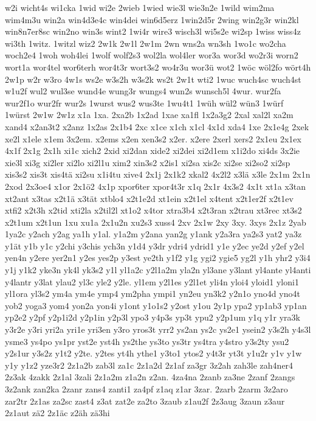 {w2i
wicht4s
wi1cka
1wid
wi2e
2wieb
1wied
wie3l
wie3n2e
1wild
wim2ma
wim4m3u
win2a
win4d3e4c
win4dei
win6d5erz
1win2d5r
2wing
win2g3r
win2kl
win8n7er8sc
win2no
win3s
wint2
1wi4r
wire3
wisch3l
wi5s2e
wi2sp
1wiss
wiss4z
wi3th
1witz.
1witzl
wiz2
2w1k
2w1l
2w1m
2wn
wns2a
wn3sh
1wo1c
wo2cha
woch2e4
1woh
woh4lei
1wolf
wolf2s3
wol2la
wol4ler
wor3a
wor3d
wo2r3i
worn2
wort1a
wor4tel
wor6terh
wor4t3r
wort3s2
wo4r3u
wor3ü
wot2
1wöc
wöl2fo
wört4h
2w1p
w2r
w3ro
4w1s
ws2e
w3s2h
w3s2k
ws2t
2w1t
wti2
1wuc
wuch4sc
wuch4st
w1u2f
wul2
wul3se
wund4e
wung3r
wungs4
wun2s
wunsch5l
4wur.
wur2fa
wur2f1o
wur2fr
wur2s
1wurst
wus2
wus3te
1wu4t1
1wüh
wül2
wün3
1würf
1würst
2w1w
2w1z
x1a
1xa.
2xa2b
1x2ad
1xae
xa1fl
1x2a3g2
2xal
xal2l
xa2m
xand4
x2an3t2
x2anz
1x2as
2x1b4
2xc
x1ce
x1ch
x1cl
4x1d
xda4
1xe
2x1e4g
2xek
xe2l
x1ele
x1em
3x2em.
x2ems
x2en
xen3s2
x2er.
x2ere
2xerl
xers2
2x1eu
2x1ex
4x1f
2x1g
2x1h
xi1c
xich2
2xid
xi2dan
xide2
xi2dei
xi2d1em
x1i2do
xi4ds
3x2ie
xie3l
xi3g
xi2ler
xi2lo
xi2l1u
xim2
xin3s2
x2is1
xi2sa
xis2c
xi2se
xi2so2
xi2sp
xis3s2
xis3t
xis4tä
xi2su
x1i4tu
xive4
2x1j
2x1k2
xkal2
4x2l2
x3lä
x3le
2x1m
2x1n
2xod
2x3oe4
x1or
2x1ö2
4x1p
xpor6ter
xpor4t3r
x1q
2x1r
4x3s2
4x1t
xt1a
x3tan
xt2ant
x3tas
x2t1ä
x3tät
xtblo4
x2t1e2d
xt1ein
x2t1el
x4tent
x2t1er2f
x2t1ev
xtfi2
x2t3h
x2tid
xti2la
x2til2l
xt1o2
x4tor
xtra3b4
x2t3ran
x2trau
xt3rec
xt3s2
x2t1um
x2t1un
1xu
xu1a
2x1u2n
xu2s3
xuss4
2xv
2x1w
2xy
3xy.
3xys
2x1z
2yab
1ya2c
y2ach
y2ag
ya1h
y1al.
y1a2m
y2ana
yan2g
y1ank
y2a3ra
ya2s3
yat2
ya3z
y1ät
y1b
y1c
y2chi
y3chis
ych3n
y1d4
y3dr
ydri4
ydrid1
y1e
y2ec
ye2d
y2ef
y2el
yen4n
y2ere
yer2n1
y2es
yes2p
y3est
ye2th
y1f2
y1g
ygi2
ygie5
yg2l
y1h
yhr2
y3i4
y1j
y1k2
yke3n
yk4l
yk3s2
y1l
yl1a2c
y2l1a2m
yla2n
yl3ane
y3lant
yl4ante
yl4anti
y4lantr
y3lat
ylau2
yl3c
yle2
y2le.
yl1em
y2l1es
y2l1et
yli4n
yloi4
yloid1
yloni1
yl1ora
yl3s2
ym4a
ym4e
ymp4
ym2pha
ympi1
yn2eu
yn3k2
y2n1o
yno4d
yno4t
yob2
yoga3
yom4
yon2a
yon4i
y1ont
y1o1s2
y2ost
y1ou
2y1p
ypa2
yp1ab3
yp1an
yp2e2
y2pf
y2p1i2d
y2p1in
y2p3l
ypo3
y4p3s
yp3t
ypu2
y2p1um
y1q
y1r
yra3k
y3r2e
y3ri
yri2a
yri1e
yri3en
y3ro
yros3t
yrr2
ys2an
ys2c
ys2e1
ysein2
y3s2h
y4s3l
ysme3
ys4po
ys1pr
yst2e
yst4h
ys2the
ys3to
ys3tr
ys4tra
y4stro
y3s2ty
ysu2
y2s1ur
y3s2z
y1t2
y2te.
y2tes
yt4h
ythe1
y3to1
ytos2
y4t3r
yt3t
y1u2r
y1v
y1w
y1y
y1z2
yze3r2
2z1a2b
zab3l
za1c
2z1a2d
2z1af
za3gr
3z2ah
zah3le
zah4ner4
2z3ak
4zakk
2z1al
3zali
2z1a2m
z1a2n
z2an.
4za4na
2zanb
za3ne
2zanf
2zangs
3z2ank
zan2ka
2zanr
zans4
zanti1
za4pf
z1aq
z1ar
3zar.
2zarb
2zarm
3z2aro
zar2tr
2z1as
za2sc
zast4
z3at
zat2e
za2to
3zaub
z1au2f
2z3aug
3zaun
z3aur
2z1aut
zä2
2z1äc
z2äh
zä3hi
}
